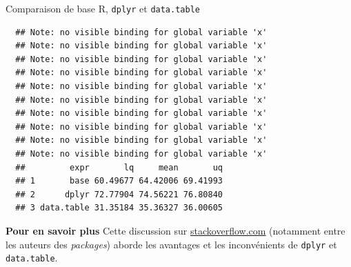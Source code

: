 \documentclass[12pt,ignorenonframetext,handout,]{beamer}
\newenvironment{Shaded}{}{}
\newcommand{\CommentTok}[1]{\textcolor[rgb]{0.00,0.50,0.00}{#1}}
\newcommand{\DataTypeTok}[1]{#1}
\newcommand{\KeywordTok}[1]{\textcolor[rgb]{0.00,0.00,1.00}{#1}}
\newcommand{\NormalTok}[1]{#1}
\newcommand{\OperatorTok}[1]{#1}
\newcommand{\StringTok}[1]{\textcolor[rgb]{0.00,0.50,0.50}{#1}}
\renewenvironment{Shaded}{\begin{snugshade}}{\end{snugshade}}
\newcommand{\intertitre}[1]{\textcolor{redInsee}{\textbf{#1}}}
\begin{document}
\begin{frame}[fragile]{Comparaison de base R, \texttt{dplyr} et
\texttt{data.table}}
\protect\hypertarget{comparaison-de-base-r-dplyr-et-data.table}{}

\footnotesize

\begin{Shaded}
\end{Shaded}

\pause \vspace{-5mm}

\begin{verbatim}
  ## Note: no visible binding for global variable 'x' 
  ## Note: no visible binding for global variable 'x' 
  ## Note: no visible binding for global variable 'x' 
  ## Note: no visible binding for global variable 'x' 
  ## Note: no visible binding for global variable 'x' 
  ## Note: no visible binding for global variable 'x' 
  ## Note: no visible binding for global variable 'x' 
  ## Note: no visible binding for global variable 'x' 
  ## Note: no visible binding for global variable 'x' 
  ## Note: no visible binding for global variable 'x'
  ##         expr       lq     mean       uq
  ## 1       base 60.49677 64.42006 69.41993
  ## 2      dplyr 72.77904 74.56221 76.80840
  ## 3 data.table 31.35184 35.36327 36.00605
\end{verbatim}

\pause \normalsize

\intertitre{Pour en savoir plus} Cette discussion sur
\href{http://stackoverflow.com/questions/21435339/data-table-vs-dplyr-can-one-do-something-well-the-other-cant-or-does-poorly}{\underline{stackoverflow.com}}
(notamment entre les auteurs des \emph{packages}) aborde les avantages
et les inconvénients de \texttt{dplyr} et \texttt{data.table}.

\end{frame}
\end{document}
